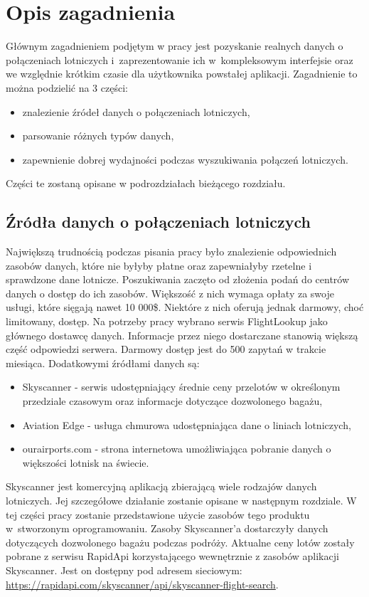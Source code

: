 \documentclass[12pt, twoside]{report}
\begin{document}
\chapter{Opis zagadnienia}
\label{chp:first}
Głównym zagadnieniem podjętym w pracy jest pozyskanie realnych danych o połączeniach lotniczych  i~zaprezentowanie ich w~kompleksowym interfejsie oraz we względnie krótkim czasie dla użytkownika powstałej aplikacji. Zagadnienie to można podzielić na 3 części:
\begin{itemize}[noitemsep,topsep=0pt]
\item znalezienie źródeł danych o połączeniach lotniczych,
\item parsowanie różnych typów danych,
\item zapewnienie dobrej wydajności podczas wyszukiwania połączeń lotniczych.
\end{itemize}
Części te zostaną opisane w podrozdziałach bieżącego rozdziału.


\section{Źródła danych o połączeniach lotniczych}
Największą trudnością podczas pisania pracy było znalezienie odpowiednich zasobów danych, które nie byłyby płatne oraz zapewniałyby rzetelne i sprawdzone dane lotnicze. Poszukiwania zaczęto od złożenia podań do centrów danych o dostęp do ich zasobów. Większość z nich wymaga opłaty za swoje usługi, które sięgają nawet 10 000\$. Niektóre z nich oferują jednak darmowy, choć limitowany, dostęp. Na potrzeby pracy wybrano serwis FlightLookup jako głównego dostawcę danych. Informacje przez niego dostarczane stanowią większą część odpowiedzi serwera. Darmowy dostęp jest do 500 zapytań w trakcie miesiąca.
Dodatkowymi źródłami danych są:
\begin{itemize}[noitemsep,topsep=0pt]
\item Skyscanner - serwis udostępniający średnie ceny przelotów w określonym przedziale czasowym oraz informacje dotyczące dozwolonego bagażu,
\item Aviation Edge - usługa chmurowa udostępniająca dane o liniach lotniczych,
\item ourairports.com - strona internetowa umożliwiająca pobranie danych o większości lotnisk na świecie.
\end{itemize}
Skyscanner jest komercyjną aplikacją zbierającą wiele rodzajów danych lotniczych. Jej szczegółowe działanie zostanie opisane w następnym rozdziale. W tej części pracy zostanie przedstawione użycie zasobów tego produktu w~stworzonym oprogramowaniu. Zasoby Skyscanner'a dostarczyły danych dotyczących dozwolonego bagażu podczas podróży. Aktualne ceny lotów zostały pobrane z serwisu RapidApi korzystającego wewnętrznie z zasobów aplikacji Skyscanner. Jest on dostępny pod adresem sieciowym: \url{https://rapidapi.com/skyscanner/api/skyscanner-flight-search}.
\end{document}
